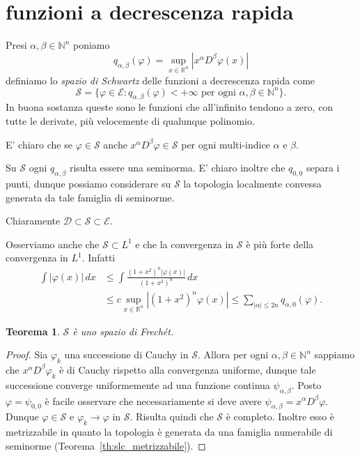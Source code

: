 \documentclass[italian,a4paper,oneside,headinclude]{scrbook}
\renewcommand{\phi}{\varphi}
\newcommand{\D}{\mathcal D}
\newcommand{\E}{\mathcal E}
\renewcommand{\S}{\mathcal S}
\newcommand{\NN}{\mathbb N}
\newcommand{\RR}{\mathbb R}
\newcommand{\abs}[1]{{\left|#1\right|}}
\newtheorem{theorem}{Teorema}
\begin{document}
\section{funzioni a decrescenza rapida}
Presi $\alpha,\beta \in \NN^n$ poniamo
\[
q_{\alpha,\beta}(\phi) = \sup_{x\in \RR^n} \abs{x^\alpha D^\beta \phi(x)}
\]
definiamo lo \emph{spazio di Schwartz} delle funzioni a decrescenza
\marginpar{$\S$}
rapida come
\[
\S = \{\phi\in \E\colon \text{$q_{\alpha,\beta}(\phi) < +\infty$ per ogni $\alpha, \beta \in \NN^n$}\}.
\]
In buona sostanza queste sono le funzioni che all'infinito tendono a
zero, con tutte le derivate, più velocemente di qualunque polinomio.

E' chiaro che se $\phi\in \S$ anche $x^\alpha D^\beta \phi \in \S$
per ogni multi-indice $\alpha$ e $\beta$.

Su $\S$ ogni $q_{\alpha,\beta}$ risulta essere una seminorma. E' chiaro inoltre
che $q_{0,0}$ separa i punti, dunque possiamo
considerare su $\S$ la topologia localmente convessa generata da tale
famiglia di seminorme.

Chiaramente $\D \subset \S \subset \E$.

Osserviamo anche che $\S\subset L^1$ e che la convergenza in $\S$ è
più forte della convergenza in $L^1$. Infatti
\begin{align*}
  \int \abs{\phi(x)}\, dx
  & \le \int \frac{(1+x^2)^n\abs{\phi(x)}}{(1+x^2)^n}\, dx \\
  & \le c \sup_{x\in \RR^n} \abs{(1+x^2)^n \phi(x)} \le \sum_{\abs{\alpha}\le 2n} q_{\alpha,0}(\phi).
\end{align*}

\begin{theorem}\label{th:SFrechet}
$\S$ è uno spazio di Frechét.
\end{theorem}
%
\begin{proof}
    Sia $\phi_k$ una successione di Cauchy in $\S$. Allora per ogni
    $\alpha,\beta\in \NN^n$ sappiamo che $x^\alpha D^\beta \phi_k$ è di
    Cauchy rispetto alla convergenza uniforme, dunque tale successione
    converge uniformemente ad una funzione continua
    $\psi_{\alpha,\beta}$. Posto $\phi=\psi_{0,0}$ è facile osservare che
    necessariamente si deve avere
    $\psi_{\alpha,\beta} = x^\alpha D^\beta \phi$.
    Dunque $\phi\in \S$ e $\phi_k \to \phi$ in $\S$. Risulta quindi che $\S$ è
    completo. Inoltre esso è metrizzabile in quanto la topologia è
    generata da una famiglia numerabile di seminorme
    (Teorema~\ref{th:slc_metrizzabile}).

\end{proof}
\end{document}
